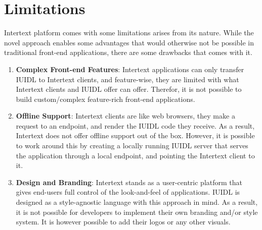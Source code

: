 \section{Limitations}

Intertext platform comes with some limitations arises from its nature. While the novel approach enables some advantages that would otherwise not be possible in traditional front-end applications, there are some drawbacks that comes with it. 

\begin{enumerate}

    \item \textbf{Complex Front-end Features}: Intertext applications can only transfer IUIDL to Intertext clients, and feature-wise, they are limited with what Intertext clients and IUIDL offer can offer. Therefor, it is not possible to build custom/complex feature-rich front-end applications.

    \item \textbf{Offline Support}: Intertext clients are like web browsers, they make a request to an endpoint, and render the IUIDL code they receive. As a result, Intertext does not offer offline support out of the box. However, it is possible to work around this by creating a locally running IUIDL server that serves the application through a local endpoint, and pointing the Intertext client to it.
    
    \item \textbf{Design and Branding}: Intertext stands as a user-centric platform that gives end-users full control of the look-and-feel of applications. IUIDL is designed as a style-agnostic language with this approach in mind. As a result, it is not possible for developers to implement their own branding and/or style system. It is however possible to add their logos or any other visuals.
    

\end{enumerate}
